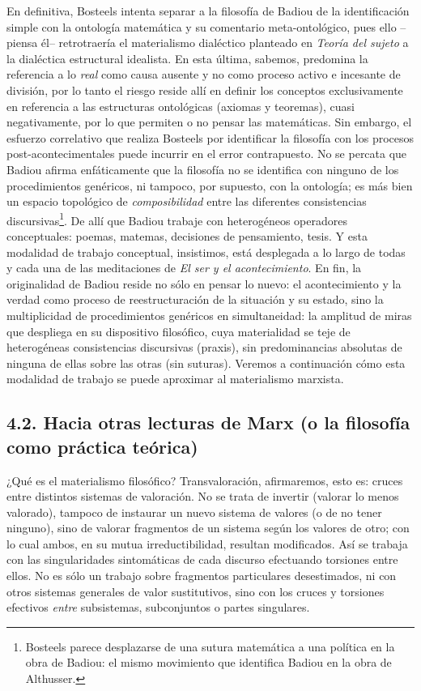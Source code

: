 \documentclass{book}
\begin{document}
En definitiva, Bosteels intenta separar a la filosofía de Badiou de la
identificación simple con la ontología matemática y su comentario
meta-ontológico, pues ello --piensa él-- retrotraería el materialismo
dialéctico planteado en \emph{Teoría del sujeto} a la dialéctica
estructural idealista. En esta última, sabemos, predomina la referencia
a lo \emph{real} como causa ausente y no como proceso activo e incesante
de división, por lo tanto el riesgo reside allí en definir los conceptos
exclusivamente en referencia a las estructuras ontológicas (axiomas y
teoremas), cuasi negativamente, por lo que permiten o no pensar las
matemáticas. Sin embargo, el esfuerzo correlativo que realiza Bosteels
por identificar la filosofía con los procesos post-acontecimentales
puede incurrir en el error contrapuesto. No se percata que Badiou afirma
enfáticamente que la filosofía no se identifica con ninguno de los
procedimientos genéricos, ni tampoco, por supuesto, con la ontología; es
más bien un espacio topológico de \emph{composibilidad} entre las
diferentes consistencias discursivas\footnote{Bosteels parece
  desplazarse de una sutura matemática a una política en la obra de
  Badiou: el mismo movimiento que identifica Badiou en la obra de
  Althusser.}. De allí que Badiou trabaje con heterogéneos operadores
conceptuales: poemas, matemas, decisiones de pensamiento, tesis. Y esta
modalidad de trabajo conceptual, insistimos, está desplegada a lo largo
de todas y cada una de las meditaciones de \emph{El ser y el
acontecimiento}. En fin, la originalidad de Badiou reside no sólo en
pensar lo nuevo: el acontecimiento y la verdad como proceso de
reestructuración de la situación y su estado, sino la multiplicidad de
procedimientos genéricos en simultaneidad: la amplitud de miras que
despliega en su dispositivo filosófico, cuya materialidad se teje de
heterogéneas consistencias discursivas (praxis), sin predominancias
absolutas de ninguna de ellas sobre las otras (sin suturas). Veremos a
continuación cómo esta modalidad de trabajo se puede aproximar al
materialismo marxista.

\subsection{4.2. Hacia otras lecturas de Marx (o la filosofía como práctica
teórica)}

¿Qué es el materialismo filosófico? Transvaloración, afirmaremos, esto
es: cruces entre distintos sistemas de valoración. No se trata de
invertir (valorar lo menos valorado), tampoco de instaurar un nuevo
sistema de valores (o de no tener ninguno), sino de valorar fragmentos
de un sistema según los valores de otro; con lo cual ambos, en su mutua
irreductibilidad, resultan modificados. Así se trabaja con las
singularidades sintomáticas de cada discurso efectuando torsiones entre
ellos. No es sólo un trabajo sobre fragmentos particulares desestimados,
ni con otros sistemas generales de valor sustitutivos, sino con los
cruces y torsiones efectivos \emph{entre} subsistemas, subconjuntos o
partes singulares.
\end{document}
